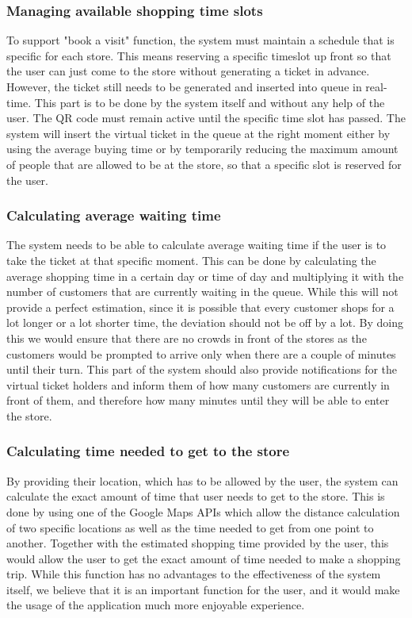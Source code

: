 \subsubsection{Managing available shopping time slots}

\hspace{\parindent}
To support "book a visit" function, the system must maintain a schedule that is specific for each store. This means reserving a specific timeslot up front so that the user can just come to the store without generating a ticket in advance. However, the ticket still needs to be generated and inserted into queue in real-time. This part is to be done by the system itself and without any help of the user. The QR code must remain active until the specific time slot has passed. The system will insert the virtual ticket in the queue at the right moment either by using the average buying time or by  temporarily reducing the maximum amount of people that are allowed to be at the store, so that a specific slot is reserved for the user.

\subsubsection{Calculating average waiting time}

\hspace{\parindent}The system needs to be able to calculate average waiting time if the user is to take the ticket at that specific moment. This can be done by calculating the average shopping time in a certain day or time of day and multiplying it with the number of customers that are currently waiting in the queue. While this will not provide a perfect estimation, since it is possible that every customer shops for a lot longer or a lot shorter time, the deviation should not be off by a lot. By doing this we would ensure that there are no crowds in front of the stores as the customers would be prompted to arrive only when there are a couple of minutes until their turn. This part of the system should also provide notifications for the virtual ticket holders and inform them of how many customers are currently in front of them, and therefore how many minutes until they will be able to enter the store. 

\subsubsection{Calculating time needed to get to the store}

\hspace{\parindent}By providing their location, which has to be allowed by the user, the system can calculate the exact amount of time that user needs to get to the store. This is done by using one of the Google Maps APIs which allow the distance calculation of two specific locations as well as the time needed to get from one point to another. Together with the estimated shopping time provided by the user, this would allow the user to get the exact amount of time needed to make a shopping trip. While this function has no advantages to the effectiveness of the system itself, we believe that it is an important function for the user, and it would make the usage of the application much more enjoyable experience.

